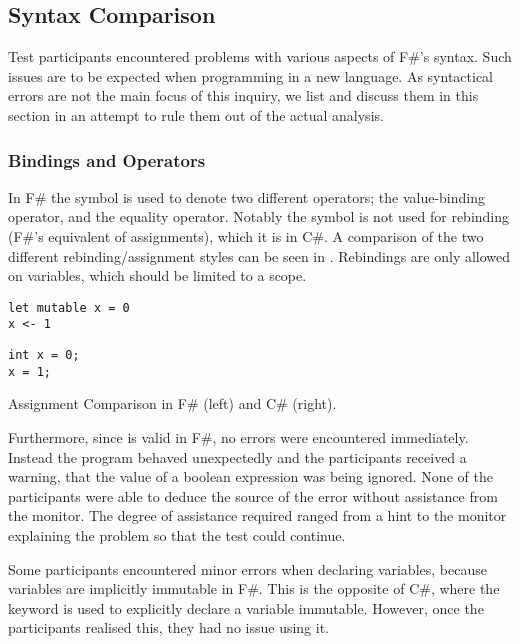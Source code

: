 \subsection{Syntax Comparison}\label{sec:syntax}
Test participants encountered problems with various aspects of F\#'s syntax. Such issues are to be expected when programming in a new language. As syntactical errors are not the main focus of this inquiry, we list and discuss them in this section in an attempt to rule them out of the actual analysis.

\subsubsection{Bindings and Operators}
In F\# the \ttt{=} symbol is used to denote two different operators; the value-binding operator, and the equality operator. Notably the symbol is not used for rebinding (F\#'s equivalent of assignments), which it is in C\#. A comparison of the two different rebinding/assignment styles can be seen in . Rebindings are only allowed on  variables, which should be limited to a scope.

\begin{listing}[H]
\begin{minipage}{.45\textwidth}
\begin{verbatim}
let mutable x = 0
x <- 1
\end{verbatim}
\end{minipage}
\hfill
\begin{minipage}{.45\textwidth}
\begin{verbatim}
int x = 0;
x = 1;
\end{verbatim}
\end{minipage}
\caption{Assignment Comparison in F\# (left) and C\# (right).}
\label{lst:ass-comp}
\end{listing}

Furthermore, since  is valid in F\#, no errors were encountered immediately. Instead the program behaved unexpectedly and the participants received a warning, that the value of a boolean expression was being ignored. None of the participants were able to deduce the source of the error without assistance from the monitor. The degree of assistance required ranged from a hint to the monitor explaining the problem so that the test could continue.

Some participants encountered minor errors when declaring variables, because variables are implicitly immutable in F\#. This is the opposite of C\#, where the  keyword is used to explicitly declare a variable immutable. However, once the participants realised this, they had no issue using it.

